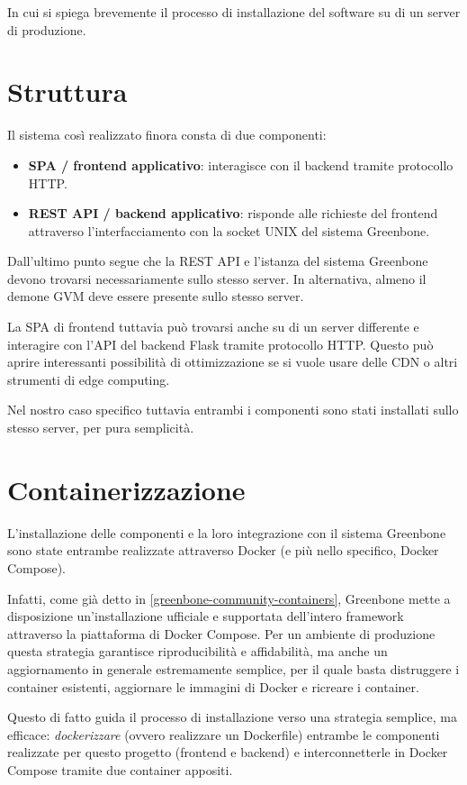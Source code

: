 In cui si spiega brevemente il processo di installazione del software su di un server di produzione.

\section{Struttura}
Il sistema così realizzato finora consta di due componenti:
\begin{itemize}
    \item \textbf{SPA / frontend applicativo}: interagisce con il backend tramite protocollo HTTP.
    \item \textbf{REST API / backend applicativo}: risponde alle richieste del frontend attraverso l'interfacciamento con la socket UNIX del sistema Greenbone.
\end{itemize}
Dall'ultimo punto segue che la REST API e l'istanza del sistema Greenbone devono trovarsi necessariamente sullo stesso server. In alternativa, almeno il demone GVM deve essere presente sullo stesso server.

La SPA di frontend tuttavia può trovarsi anche su di un server differente e interagire con l'API del backend Flask tramite protocollo HTTP. Questo può aprire interessanti possibilità di ottimizzazione se si vuole usare delle CDN o altri strumenti di edge computing.

Nel nostro caso specifico tuttavia entrambi i componenti sono stati installati sullo stesso server, per pura semplicità.

\section{Containerizzazione}
L'installazione delle componenti e la loro integrazione con il sistema Greenbone sono state entrambe realizzate attraverso Docker (e più nello specifico, Docker Compose).

Infatti, come già detto in \ref{greenbone-community-containers}, Greenbone mette a disposizione un'installazione ufficiale e supportata dell'intero framework attraverso la piattaforma di Docker Compose. Per un ambiente di produzione questa strategia garantisce riproducibilità e affidabilità, ma anche un aggiornamento in generale estremamente semplice, per il quale basta distruggere i container esistenti, aggiornare le immagini di Docker e ricreare i container.

Questo di fatto guida il processo di installazione verso una strategia semplice, ma efficace: \emph{dockerizzare} (ovvero realizzare un Dockerfile) entrambe le componenti realizzate per questo progetto (frontend e backend) e interconnetterle in Docker Compose tramite due container appositi.

